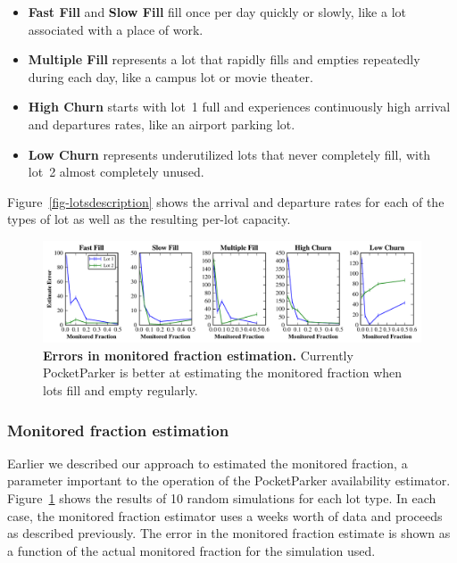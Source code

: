\documentclass{sigchi}
\begin{document}
\begin{itemize}

\item \textbf{Fast Fill} and \textbf{Slow Fill} fill once per day quickly or
slowly, like a lot associated with a place of work.

\item \textbf{Multiple Fill} represents a lot that rapidly fills and empties
repeatedly during each day, like a campus lot or movie theater.

\item \textbf{High Churn} starts with lot~1 full and experiences continuously
high arrival and departures rates, like an airport parking lot.

\item \textbf{Low Churn} represents underutilized lots that never completely
fill, with lot~2 almost completely unused.

\end{itemize}

Figure~\ref{fig-lotsdescription} shows the arrival and departure rates for
each of the types of lot as well as the resulting per-lot capacity.

\begin{figure}
\centering
\includegraphics[width=\textwidth]{./simulator/figures/capacity_experiment.pdf}

\caption{\textbf{Errors in monitored fraction estimation.} Currently
PocketParker is better at estimating the monitored fraction when lots fill
and empty regularly.}

\label{fig-capacityerrors}
\end{figure}

\subsubsection{Monitored fraction estimation}

Earlier we described our approach to estimated the monitored fraction, a
parameter important to the operation of the PocketParker availability
estimator. Figure~\ref{fig-capacityerrors} shows the results of 10 random
simulations for each lot type. In each case, the monitored fraction estimator
uses a weeks worth of data and proceeds as described previously. The error in
the monitored fraction estimate is shown as a function of the actual
monitored fraction for the simulation used.
\end{document}
